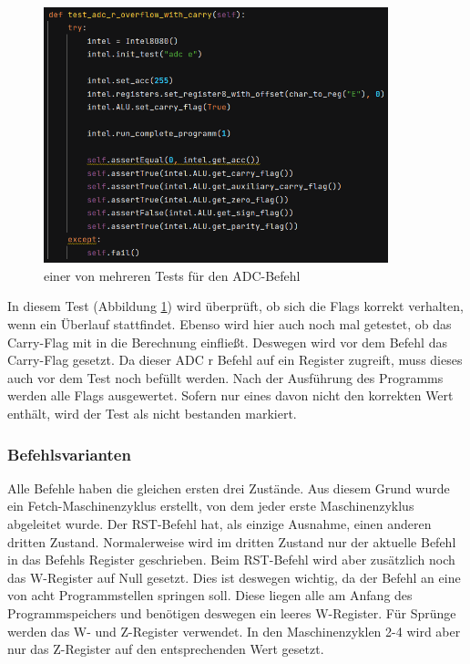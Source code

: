 \documentclass[12pt]{article}
\newcommand{\imgSpaceBefore}{\vspace{10pt}}
\begin{document}
\imgSpaceBefore
\begin{figure}[H]
\centering
\includegraphics[width=10cm]{bilder/test_adc}
\caption{einer von mehreren Tests für den ADC-Befehl}
\label{fig:test_adc}
\end{figure}

\noindent
In diesem Test (Abbildung \ref{fig:test_adc}) wird überprüft, ob sich die Flags korrekt verhalten, wenn ein Überlauf stattfindet. Ebenso wird hier auch noch mal getestet, ob das Carry-Flag mit in die Berechnung einfließt. Deswegen wird vor dem Befehl das Carry-Flag gesetzt. Da dieser ADC r Befehl auf ein Register zugreift, muss dieses auch vor dem Test noch befüllt werden. Nach der Ausführung des Programms werden alle Flags ausgewertet. Sofern nur eines davon nicht den korrekten Wert enthält, wird der Test als nicht bestanden markiert.


\subsubsection{Befehlsvarianten}
Alle Befehle haben die gleichen ersten drei Zustände. Aus diesem Grund wurde ein Fetch-Maschinenzyklus erstellt, von dem jeder erste Maschinenzyklus abgeleitet wurde. Der RST-Befehl hat, als einzige Ausnahme, einen anderen dritten Zustand. Normalerweise wird im dritten Zustand nur der aktuelle Befehl in das Befehls Register geschrieben. Beim RST-Befehl wird aber zusätzlich noch das W-Register auf Null gesetzt. Dies ist deswegen wichtig, da der Befehl an eine von acht Programmstellen springen soll. Diese liegen alle am Anfang des Programmspeichers und benötigen deswegen ein leeres W-Register. Für Sprünge werden das W- und Z-Register verwendet. In den Maschinenzyklen 2-4 wird aber nur das Z-Register auf den entsprechenden Wert gesetzt.
\\
\end{document}
